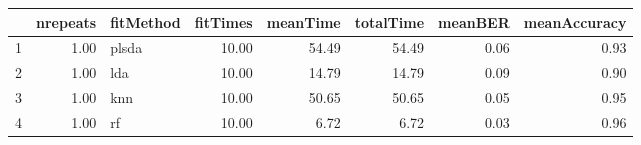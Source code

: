 \begin{table}[ht]
\centering
\begin{tabular}{rrlrrrrr}
  \hline
 & nrepeats & fitMethod & fitTimes & meanTime & totalTime & meanBER & meanAccuracy \\ 
  \hline
1 & 1.00 & plsda & 10.00 & 54.49 & 54.49 & 0.06 & 0.93 \\ 
  2 & 1.00 & lda & 10.00 & 14.79 & 14.79 & 0.09 & 0.90 \\ 
  3 & 1.00 & knn & 10.00 & 50.65 & 50.65 & 0.05 & 0.95 \\ 
  4 & 1.00 & rf & 10.00 & 6.72 & 6.72 & 0.03 & 0.96 \\ 
   \hline
\end{tabular}
\end{table}
